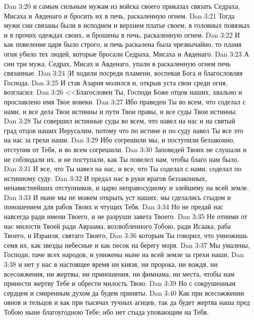 \vs Dan 3:20 и самым сильным мужам из войска своего приказал связать Седраха, Мисаха и Авденаго и бросить их в печь, раскаленную огнем.
\vs Dan 3:21 Тогда мужи сии связаны были в исподнем и верхнем платье своем, в головных повязках и в прочих одеждах своих, и брошены в печь, раскаленную огнем.
\vs Dan 3:22 И как повеление царя было строго, и печь раскалена была чрезвычайно, то пламя огня убило тех людей, которые бросали Седраха, Мисаха и Авденаго.
\vs Dan 3:23 А сии три мужа, Седрах, Мисах и Авденаго, упали в раскаленную огнем печь связанные.
\vs Dan 3:24 [И ходили посреди пламени, воспевая Бога и благословляя Господа.
\vs Dan 3:25 И став Азария молился и, открыв уста свои среди огня, возгласил:
\rsbpar\vs Dan 3:26 <<Благословен Ты, Господи Боже отцов наших, хвально и прославлено имя Твое вовеки.
\vs Dan 3:27 Ибо праведен Ты во всем, что соделал с нами, и все дела Твои истинны и пути Твои правы, и все суды Твои истинны.
\vs Dan 3:28 Ты совершил истинные суды во всем, что навел на нас и на святый град отцов наших Иерусалим, потому что по истине и по суду навел Ты все это на нас за грехи наши.
\vs Dan 3:29 Ибо согрешили мы, и поступили беззаконно, отступив от Тебя, и во всем согрешили.
\vs Dan 3:30 Заповедей Твоих не слушали и не соблюдали их, и не поступали, как Ты повелел нам, чтобы благо нам было.
\vs Dan 3:31 И все, что Ты навел на нас, и все, что Ты соделал с нами, соделал по истинному суду.
\vs Dan 3:32 И предал нас в руки врагов беззаконных, ненавистнейших отступников, и царю неправосудному и злейшему на всей земле.
\vs Dan 3:33 И ныне мы не можем открыть уст наших; мы сделались стыдом и поношением для рабов Твоих и чтущих Тебя.
\vs Dan 3:34 Но не предай нас навсегда ради имени Твоего, и не разруши завета Твоего.
\vs Dan 3:35 Не отними от нас милости Твоей ради Авраама, возлюбленного Тобою, ради Исаака, раба Твоего, и Израиля, святаго Твоего,
\vs Dan 3:36 которым Ты говорил, что умножишь семя их, как звезды небесные и как песок на берегу моря.
\vs Dan 3:37 Мы умалены, Господи, паче всех народов, и унижены ныне на всей земле за грехи наши,
\vs Dan 3:38 и нет у нас в настоящее время ни князя, ни пророка, ни вождя, ни всесожжения, ни жертвы, ни приношения, ни фимиама, ни места, чтобы нам принести жертву Тебе и обрести милость Твою.
\vs Dan 3:39 Но с сокрушенным сердцем и смиренным духом да будем приняты.
\vs Dan 3:40 Как при всесожжении овнов и тельцов и как при тысячах тучных агнцев, так да будет жертва наша пред Тобою ныне благоугодною Тебе; ибо нет стыда уповающим на Тебя.
